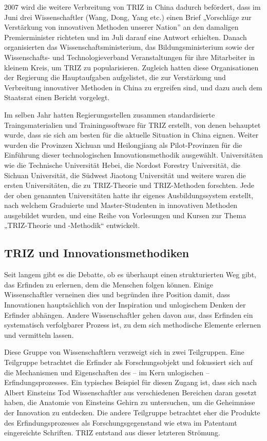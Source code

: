 \documentclass[11pt,a4paper]{article}
\begin{document}
2007 wird die weitere Verbreitung von TRIZ in China dadurch befördert, dass im
Juni drei Wissenschaftler (Wang, Dong, Yang etc.) einen Brief „Vorschläge zur
Verstärkung von innovativen Methoden unserer Nation” an den damaligen
Premierminister richteten und im Juli darauf eine Antwort erhielten. Danach
organisierten das Wissenschaftsministerium, das Bildungsministerium sowie
der Wissenschafts- und Technologieverband Veranstaltungen für ihre Mitarbeiter
in kleinem Kreis, um TRIZ zu popularisieren. Zugleich hatten diese
Organisationen der Regierung die Hauptaufgaben aufgelistet, die zur
Verstärkung und Verbreitung innovativer Methoden in China zu ergreifen sind,
und dazu auch dem Staatsrat einen Bericht vorgelegt.

Im selben Jahr hatten Regierungsstellen zusammen standardisierte
Traingsmaterialien und Trainingssoftware für TRIZ erstellt, von denen
behauptet wurde, dass sie sich am besten für die aktuelle Situation in China
eignen. Weiter wurden die Provinzen Xichuan und Heilongjiang als
Pilot-Provinzen für die Einführung dieser technologischen Innovationsmethodik
ausgewählt. Universitäten wie die Technische Universität Hebei, die Nordost
Forestry Universität, die Sichuan Universität, die Südwest Jiaotong
Universität und weitere waren die ersten Universitäten, die zu TRIZ-Theorie
und TRIZ-Methoden forschten. Jede der oben genannten Universitäten hatte ihr
eigenes Ausbildungssystem erstellt, nach welchem Graduierte und
Master-Studenten in innovativen Methoden ausgebildet wurden, und eine Reihe
von Vorlesungen und Kursen zur Thema „TRIZ-Theorie und -Methodik“ entwickelt.

\subsection{TRIZ und Innovationsmethodiken}

Seit langem gibt es die Debatte, ob es überhaupt einen strukturierten Weg
gibt, das Erfinden zu erlernen, dem die Menschen folgen können.  Einige
Wissenschaftler verneinen dies und begründen ihre Position damit, dass
Innovationen hauptsächlich von der Inspiration und unlogischem Denken der
Erfinder abhängen.  Andere Wissenschaftler gehen davon aus, dass Erfinden ein
systematisch verfolgbarer Prozess ist, zu dem sich methodische Elemente
erlernen und vermitteln lassen.

Diese Gruppe von Wissenschaftlern verzweigt sich in zwei Teilgruppen. Eine
Teilgruppe betrachtet die Erfinder als Forschungsobjekt und fokussiert sich
auf die Mechanismen und Eigenschaften des -- im Kern unlogischen --
Erfindungsprozesses.  Ein typisches Beispiel für diesen Zugang ist, dass sich
nach Albert Einsteins Tod Wissenschaftler aus verschiedenen Bereichen daran
gesetzt haben, die Anatomie von Einsteins Gehirn zu untersuchen, um die
Geheimnisse der Innovation zu entdecken. Die andere Teilgruppe betrachtet eher
die Produkte des Erfindungsprozesses als Forschungsgegenstand wie etwa im
Patentamt eingereichte Schriften. TRIZ entstand aus dieser letzteren Strömung.
\end{document}
